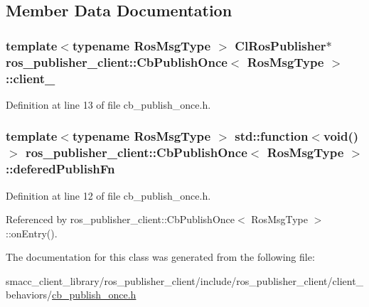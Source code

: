 \subsection{Member Data Documentation}
\subsubsection[{\texorpdfstring{client\+\_\+}{client_}}]{\setlength{\rightskip}{0pt plus 5cm}template$<$typename Ros\+Msg\+Type $>$ {\bf Cl\+Ros\+Publisher}$\ast$ {\bf ros\+\_\+publisher\+\_\+client\+::\+Cb\+Publish\+Once}$<$ Ros\+Msg\+Type $>$\+::client\+\_\+\hspace{0.3cm}{\ttfamily [private]}}\hypertarget{classros__publisher__client_1_1CbPublishOnce_a50a1b2a4892ad780406231e0f870746a}{}\label{classros__publisher__client_1_1CbPublishOnce_a50a1b2a4892ad780406231e0f870746a}


Definition at line 13 of file cb\+\_\+publish\+\_\+once.\+h.

\subsubsection[{\texorpdfstring{defered\+Publish\+Fn}{deferedPublishFn}}]{\setlength{\rightskip}{0pt plus 5cm}template$<$typename Ros\+Msg\+Type $>$ std\+::function$<$void()$>$ {\bf ros\+\_\+publisher\+\_\+client\+::\+Cb\+Publish\+Once}$<$ Ros\+Msg\+Type $>$\+::defered\+Publish\+Fn\hspace{0.3cm}{\ttfamily [private]}}\hypertarget{classros__publisher__client_1_1CbPublishOnce_a91e0e3d574d25e160bcb3a4ca81bb0b2}{}\label{classros__publisher__client_1_1CbPublishOnce_a91e0e3d574d25e160bcb3a4ca81bb0b2}


Definition at line 12 of file cb\+\_\+publish\+\_\+once.\+h.



Referenced by ros\+\_\+publisher\+\_\+client\+::\+Cb\+Publish\+Once$<$ Ros\+Msg\+Type $>$\+::on\+Entry().



The documentation for this class was generated from the following file\+:\begin{DoxyCompactItemize}
\item 
smacc\+\_\+client\+\_\+library/ros\+\_\+publisher\+\_\+client/include/ros\+\_\+publisher\+\_\+client/client\+\_\+behaviors/\hyperlink{cb__publish__once_8h}{cb\+\_\+publish\+\_\+once.\+h}\end{DoxyCompactItemize}
